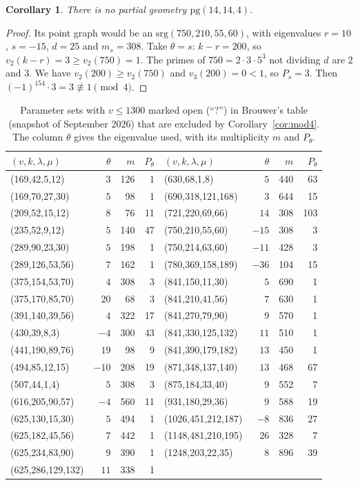 \documentclass[11pt]{amsart}
\newtheorem{corollary}[theorem]{Corollary}
\theoremstyle{remark}
\begin{document}
\begin{corollary}\label{cor:pg}
There is no partial geometry $\mathrm{pg}(14,14,4)$.
\end{corollary}
\begin{proof}
Its point graph would be an $\mathrm{srg}(750,210,55,60)$, with eigenvalues $r=10$, $s=-15$, $d=25$ and $m_s=308$.
Take $\theta=s$: $k-r=200$, so $v_2(k-r)=3\ge v_2(750)=1$. The primes of $750=2\cdot3\cdot5^3$ not dividing $d$ are $2$
and $3$. We have $v_2(200)\ge v_2(750)$ and $v_3(200)=0<1$, so $P_s=3$. Then $(-1)^{154}\cdot3=3\not\equiv1\pmod4$.
\end{proof}

\begin{table}[ht]
\centering\small
\caption{Parameter sets with $v\le 1300$ marked open (``?'') in Brouwer's table (snapshot of September 2026) that are
excluded by Corollary~\ref{cor:mod4}. The column $\theta$ gives the eigenvalue used, with its multiplicity $m$ and $P_\theta$.}
\label{tab:open}
\begin{tabular}{lrrr@{\qquad}lrrr}
\toprule
$(v,k,\lambda,\mu)$ & $\theta$ & $m$ & $P_\theta$ & $(v,k,\lambda,\mu)$ & $\theta$ & $m$ & $P_\theta$\\
\midrule
(169,42,5,12) & $3$ & 126 & 1 & (630,68,1,8) & $5$ & 440 & 63\\
(169,70,27,30) & $5$ & 98 & 1 & (690,318,121,168) & $3$ & 644 & 15\\
(209,52,15,12) & $8$ & 76 & 11 & (721,220,69,66) & $14$ & 308 & 103\\
(235,52,9,12) & $5$ & 140 & 47 & (750,210,55,60) & $-15$ & 308 & 3\\
(289,90,23,30) & $5$ & 198 & 1 & (750,214,63,60) & $-11$ & 428 & 3\\
(289,126,53,56) & $7$ & 162 & 1 & (780,369,158,189) & $-36$ & 104 & 15\\
(375,154,53,70) & $4$ & 308 & 3 & (841,150,11,30) & $5$ & 690 & 1\\
(375,170,85,70) & $20$ & 68 & 3 & (841,210,41,56) & $7$ & 630 & 1\\
(391,140,39,56) & $4$ & 322 & 17 & (841,270,79,90) & $9$ & 570 & 1\\
(430,39,8,3) & $-4$ & 300 & 43 & (841,330,125,132) & $11$ & 510 & 1\\
(441,190,89,76) & $19$ & 98 & 9 & (841,390,179,182) & $13$ & 450 & 1\\
(494,85,12,15) & $-10$ & 208 & 19 & (871,348,137,140) & $13$ & 468 & 67\\
(507,44,1,4) & $5$ & 308 & 3 & (875,184,33,40) & $9$ & 552 & 7\\
(616,205,90,57) & $-4$ & 560 & 11 & (931,180,29,36) & $9$ & 588 & 19\\
(625,130,15,30) & $5$ & 494 & 1 & (1026,451,212,187) & $-8$ & 836 & 27\\
(625,182,45,56) & $7$ & 442 & 1 & (1148,481,210,195) & $26$ & 328 & 7\\
(625,234,83,90) & $9$ & 390 & 1 & (1248,203,22,35) & $8$ & 896 & 39\\
(625,286,129,132) & $11$ & 338 & 1 &  & & &\\
\bottomrule
\end{tabular}
\end{table}
\end{document}
